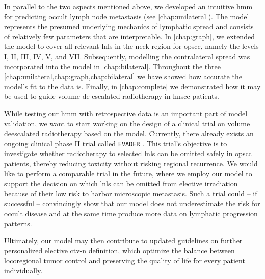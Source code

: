 \documentclass[\relativeRoot/main.tex]{subfiles}
\begin{document}
In parallel to the two aspects mentioned above, we developed an intuitive \gls{hmm} for predicting occult lymph node metastasis (see \cref{chap:unilateral}). The model represents the presumed underlying mechanics of lymphatic spread and consists of relatively few parameters that are interpretable. In \cref{chap:graph}, we extended the model to cover all relevant \glspl{lnl} in the neck region for \gls{opscc}, namely the levels I, II, III, IV, V, and VII. Subsequently, modelling the contralateral spread was incorporated into the model in \cref{chap:bilateral}. Throughout the three \cref{chap:unilateral,chap:graph,chap:bilateral} we have showed how accurate the model's fit to the data is. Finally, in \cref{chap:complete} we demonstrated how it may be used to guide volume de-escalated radiotherapy in \gls{hnscc} patients.

While testing our \gls{hmm} with retrospective data is an important part of model validation, we want to start working on the design of a clinical trial on volume deescalated radiotherapy based on the model. Currently, there already exists an ongoing clinical phase II trial called \texttt{EVADER} \cite{bratman_-escalation_nodate}. This trial's objective is to investigate whether radiotherapy to selected \glspl{lnl} can be omitted safely in \gls{opscc} patients, thereby reducing toxicity without risking regional recurrence. We would like to perform a comparable trial in the future, where we employ our model to support the decision on which \glspl{lnl} can be omitted from elective irradiation because of their low risk to harbor microscopic metastasis. Such a trial could -- if successful -- convincingly show that our model does not underestimate the risk for occult disease and at the same time produce more data on lymphatic progression patterns.

Ultimately, our model may then contribute to updated guidelines on further personalized elective \gls{ctv-n} definition, which optimize the balance between locoregional tumor control and preserving the quality of life for every patient individually.
\end{document}
